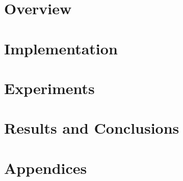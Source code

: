 \documentclass[xetex,xcolor=pdftex,dvipsnames,table,%
	       10pt, a4paper, twoside, openany]{book}
\begin{document}
\frontmatter


\mainmatter
\part{Overview}
\label{pt:overview}


\part{Implementation}
\label{pt:implementation}

\part{Experiments}
\label{pt:experiments}

\part{Results and Conclusions}
\label{pt:results}

\label{pt:conclusions}

\part{Appendices}
\label{pt:appendices}


\backmatter

\end{document}
